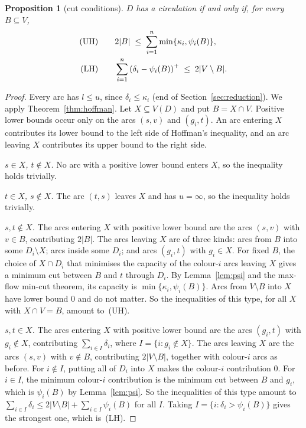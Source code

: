 \documentclass[11pt]{amsart}
\newtheorem{proposition}[theorem]{Proposition}
\theoremstyle{definition}
\theoremstyle{remark}
\newcommand{\pos}[1]{\left(#1\right)^{+}}
\begin{document}
\begin{proposition}[cut conditions]\label{prop:cuts}
$D$ has a circulation if and only if, for every $B\subseteq V$,
\begin{align}
\textup{(UH)}\qquad & 2|B|\;\le\;\sum_{i=1}^n\min\{\kappa_i,\psi_i(B)\}, \label{eq:UH}\\
\textup{(LH)}\qquad & \sum_{i=1}^n\pos{\delta_i-\psi_i(B)}\;\le\;2|V\setminus B|. \label{eq:LH}
\end{align}
\end{proposition}

\begin{proof}
Every arc has $l\le u$, since $\delta_i\le\kappa_i$ (end of Section~\ref{sec:reduction}). We
apply Theorem~\ref{thm:hoffman}. Let $X\subseteq V(D)$ and put $B=X\cap V$. Positive lower
bounds occur only on the arcs $(s,v)$ and $(g_i,t)$. An arc entering $X$ contributes its
lower bound to the left side of Hoffman's inequality, and an arc leaving $X$ contributes its
upper bound to the right side.

\emph{$s\in X$, $t\notin X$.} No arc with a positive lower bound enters $X$, so the inequality
holds trivially.

\emph{$t\in X$, $s\notin X$.} The arc $(t,s)$ leaves $X$ and has $u=\infty$, so the
inequality holds trivially.

\emph{$s,t\notin X$.} The arcs entering $X$ with positive lower bound are the arcs $(s,v)$
with $v\in B$, contributing $2|B|$. The arcs leaving $X$ are of three kinds: arcs from $B$ into
some $D_i\setminus X$; arcs inside some $D_i$; and arcs $(g_i,t)$ with $g_i\in X$. For fixed
$B$, the choice of $X\cap D_i$ that minimises the capacity of the colour-$i$ arcs leaving $X$
gives a minimum cut between $B$ and $t$ through $D_i$. By Lemma~\ref{lem:psi} and the
max-flow min-cut theorem, its capacity is $\min\{\kappa_i,\psi_i(B)\}$. Arcs from $V\setminus B$
into $X$ have lower bound $0$ and do not matter. So the inequalities of this type, for all
$X$ with $X\cap V=B$, amount to~(UH).

\emph{$s,t\in X$.} The arcs entering $X$ with positive lower bound are the arcs $(g_i,t)$
with $g_i\notin X$, contributing $\sum_{i\in I}\delta_i$, where $I=\{i:g_i\notin X\}$. The arcs
leaving $X$ are the arcs $(s,v)$ with $v\notin B$, contributing $2|V\setminus B|$, together
with colour-$i$ arcs as before. For $i\notin I$, putting all of $D_i$ into $X$ makes the
colour-$i$ contribution $0$. For $i\in I$, the minimum colour-$i$ contribution is the minimum
cut between $B$ and $g_i$, which is $\psi_i(B)$ by Lemma~\ref{lem:psi}. So the inequalities of
this type amount to
$\sum_{i\in I}\delta_i\le 2|V\setminus B|+\sum_{i\in I}\psi_i(B)$ for all $I$. Taking
$I=\{i:\delta_i>\psi_i(B)\}$ gives the strongest one, which is~(LH).
\end{proof}
\end{document}
